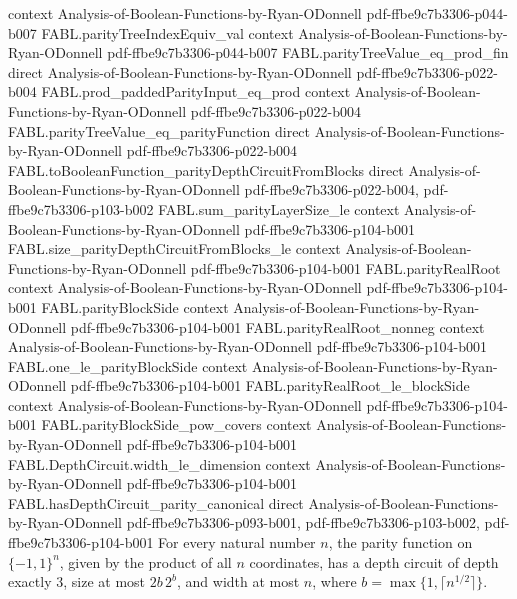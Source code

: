 \begin{theorem}
  {context}
  {Analysis-of-Boolean-Functions-by-Ryan-ODonnell}
  {pdf-ffbe9c7b3306-p044-b007}
\proofstep
  {FABL.parityTreeIndexEquiv_val}
  {context}
  {Analysis-of-Boolean-Functions-by-Ryan-ODonnell}
  {pdf-ffbe9c7b3306-p044-b007}
\proofstep
  {FABL.parityTreeValue_eq_prod_fin}
  {direct}
  {Analysis-of-Boolean-Functions-by-Ryan-ODonnell}
  {pdf-ffbe9c7b3306-p022-b004}
\proofstep
  {FABL.prod_paddedParityInput_eq_prod}
  {context}
  {Analysis-of-Boolean-Functions-by-Ryan-ODonnell}
  {pdf-ffbe9c7b3306-p022-b004}
\proofstep
  {FABL.parityTreeValue_eq_parityFunction}
  {direct}
  {Analysis-of-Boolean-Functions-by-Ryan-ODonnell}
  {pdf-ffbe9c7b3306-p022-b004}
\proofstep
  {FABL.toBooleanFunction_parityDepthCircuitFromBlocks}
  {direct}
  {Analysis-of-Boolean-Functions-by-Ryan-ODonnell}
  {pdf-ffbe9c7b3306-p022-b004,
    pdf-ffbe9c7b3306-p103-b002}
\proofstep
  {FABL.sum_parityLayerSize_le}
  {context}
  {Analysis-of-Boolean-Functions-by-Ryan-ODonnell}
  {pdf-ffbe9c7b3306-p104-b001}
\proofstep
  {FABL.size_parityDepthCircuitFromBlocks_le}
  {context}
  {Analysis-of-Boolean-Functions-by-Ryan-ODonnell}
  {pdf-ffbe9c7b3306-p104-b001}
\proofstep
  {FABL.parityRealRoot}
  {context}
  {Analysis-of-Boolean-Functions-by-Ryan-ODonnell}
  {pdf-ffbe9c7b3306-p104-b001}
\proofstep
  {FABL.parityBlockSide}
  {context}
  {Analysis-of-Boolean-Functions-by-Ryan-ODonnell}
  {pdf-ffbe9c7b3306-p104-b001}
\proofstep
  {FABL.parityRealRoot_nonneg}
  {context}
  {Analysis-of-Boolean-Functions-by-Ryan-ODonnell}
  {pdf-ffbe9c7b3306-p104-b001}
\proofstep
  {FABL.one_le_parityBlockSide}
  {context}
  {Analysis-of-Boolean-Functions-by-Ryan-ODonnell}
  {pdf-ffbe9c7b3306-p104-b001}
\proofstep
  {FABL.parityRealRoot_le_blockSide}
  {context}
  {Analysis-of-Boolean-Functions-by-Ryan-ODonnell}
  {pdf-ffbe9c7b3306-p104-b001}
\proofstep
  {FABL.parityBlockSide_pow_covers}
  {context}
  {Analysis-of-Boolean-Functions-by-Ryan-ODonnell}
  {pdf-ffbe9c7b3306-p104-b001}
\proofstep
  {FABL.DepthCircuit.width_le_dimension}
  {context}
  {Analysis-of-Boolean-Functions-by-Ryan-ODonnell}
  {pdf-ffbe9c7b3306-p104-b001}
\proofstep
  {FABL.hasDepthCircuit_parity_canonical}
  {direct}
  {Analysis-of-Boolean-Functions-by-Ryan-ODonnell}
  {pdf-ffbe9c7b3306-p093-b001,
    pdf-ffbe9c7b3306-p103-b002,
    pdf-ffbe9c7b3306-p104-b001}
For every natural number $n$, the parity function on $\{-1,1\}^n$, given by the
product of all $n$ coordinates, has a depth circuit of depth exactly $3$, size at most
$2b\,2^b$, and width at most $n$, where $b=\max\{1,\lceil n^{1/2}\rceil\}$.
\end{theorem}

